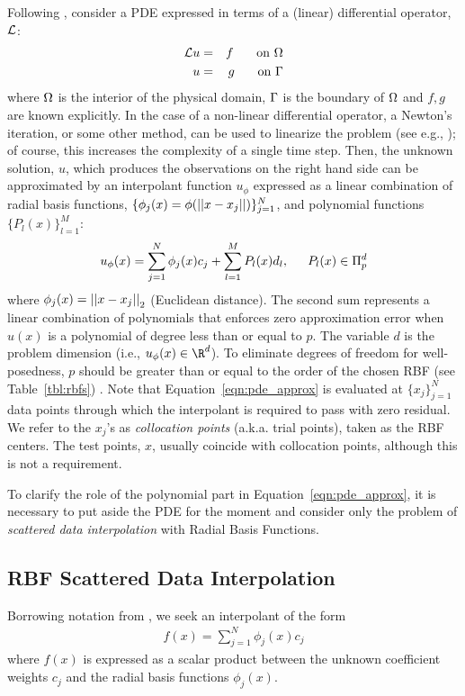 \documentclass[11pt]{report}
\begin{document}
{Following \cite{Mouat2002}, consider a PDE expressed in terms of a (linear) differential operator, $\diffop$: 
\begin{eqnarray*}
\mathcal{L}u & = & f \hskip1.5em \textrm{ on } \Omega \\
u &=& g \hskip1.5em \textrm{ on } \Gamma
\end{eqnarray*}
where $\Omega$ is the interior of the physical domain, $\Gamma$ is the boundary of $\Omega$ and $f,g$ are known explicitly. In the case of a non-linear differential operator, a Newton's iteration, or some other method, can be used to linearize the problem (see e.g., \cite{WrightFornberg06}); of course, this increases the complexity of a single time step. Then, the unknown solution, $u$, which produces the observations on the right hand side can be approximated by an interpolant function $u_{\phi}$ expressed as a linear combination of radial basis functions, $\{\phi_j(x) = \phi(\left|\left|x-x_j\right|\right|)\}_{j=1}^{N}$, and polynomial functions$\{P_l(x)\}_{l=1}^{M}$:
\begin{equation}
	u_{\phi}(x) = \sum_{j=1}^{N}  \phi_j(x) c_{j} + \sum_{l=1}^{M}  P_l(x) d_{l}, \hskip1.5em P_l(x) \in \Pi^{d}_{p}
	\label{eqn:pde_approx}
\end{equation}
where $\phi_j(x) = \left|\left|x - x_j\right|\right|_2$ (Euclidean distance). The 
second sum represents a linear combination of polynomials that enforces zero approximation error
 when $u(x)$ is a polynomial of degree less than or equal to $p$. The variable $d$ is the 
 problem dimension (i.e., $u_{\phi}(x) \in \R^{d}$). 
To eliminate degrees of freedom for well-posedness, $p$ should be greater than or equal to the order of the chosen RBF
 (see Table~\ref{tbl:rbfs}) \cite{Iske2004}.  
Note that Equation~\ref{eqn:pde_approx} is evaluated 
 at $\{x_j\}_{j=1}^{N}$ 
data points through which the interpolant is required to pass with zero residual.  We refer to 
the $x_j$'s as \emph{collocation points} (a.k.a. trial points), taken as the RBF centers. The test points, $x$, usually coincide with collocation points, although this is not a requirement. 

To clarify the role of the polynomial part in Equation~\ref{eqn:pde_approx}, it is necessary to
put aside the PDE for the moment and consider only the problem of \emph{scattered data 
interpolation} with Radial Basis Functions.

\subsection{RBF Scattered Data Interpolation}
 Borrowing notation from \cite{Fasshauer2007, Iske2004}, 
we seek an interpolant of the form
\begin{eqnarray*}
f(x) = \sum_{j=1}^{N} \phi_j(x) c_{j}  \label{eq:rbf_scattered_data_interp}
\end{eqnarray*}
where $f(x)$ is expressed as a scalar product between the unknown coefficient weights $c_j$ and the radial basis functions $\phi_j(x)$.

}
\end{document}
